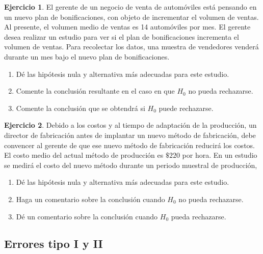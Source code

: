 \documentclass[
  11pt,
]{book}
\providecommand{\tightlist}{%
  \setlength{\itemsep}{0pt}\setlength{\parskip}{0pt}}
\theoremstyle{definition}
\theoremstyle{definition}
\theoremstyle{definition}
\newtheorem{exercise}{Ejercicio}[chapter]
\theoremstyle{definition}
\theoremstyle{remark}
\begin{document}
\begin{exercise}

El gerente de un negocio de venta de automóviles está pensando en un nuevo plan de bonificaciones, con objeto de incrementar el volumen de ventas. Al presente, el volumen medio de ventas es 14 automóviles por mes. El gerente desea realizar un estudio para ver si el plan de
bonificaciones incrementa el volumen de ventas. Para recolectar los datos, una muestra de vendedores venderá durante un mes bajo el nuevo plan de bonificaciones.

\begin{enumerate}
\def\labelenumi{\alph{enumi}.}
\tightlist
\item
  Dé las hipótesis nula y alternativa más adecuadas para este estudio.
\item
  Comente la conclusión resultante en el caso en que \(H_0\) no pueda rechazarse.
\item
  Comente la conclusión que se obtendrá si \(H_0\) puede rechazarse.
\end{enumerate}

\end{exercise}

\begin{exercise}

Debido a los costos y al tiempo de adaptación de la producción, un director de fabricación antes de implantar un nuevo método de fabricación, debe convencer al gerente de que ese nuevo método de fabricación reducirá los costos. El costo medio del actual método de producción es \(\$220\) por hora. En un estudio se medirá el costo del nuevo método durante un periodo muestral de producción,

\begin{enumerate}
\def\labelenumi{\alph{enumi}.}
\tightlist
\item
  Dé las hipótesis nula y alternativa más adecuadas para este estudio.
\item
  Haga un comentario sobre la conclusión cuando \(H_0\) no pueda rechazarse.
\item
  Dé un comentario sobre la conclusión cuando \(H_0\) pueda rechazarse.
\end{enumerate}

\end{exercise}

\subsection{Errores tipo I y II}\label{errores-tipo-i-y-ii}
\end{document}

